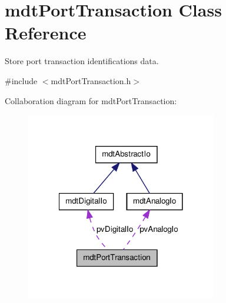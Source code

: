 \hypertarget{classmdt_port_transaction}{
\section{mdtPortTransaction Class Reference}
\label{classmdt_port_transaction}
}


Store port transaction identifications data.  




{\ttfamily \#include $<$mdtPortTransaction.h$>$}



Collaboration diagram for mdtPortTransaction:
\nopagebreak
\begin{figure}[H]
\begin{center}
\leavevmode
\includegraphics[width=236pt]{classmdt_port_transaction__coll__graph}
\end{center}
\end{figure}
